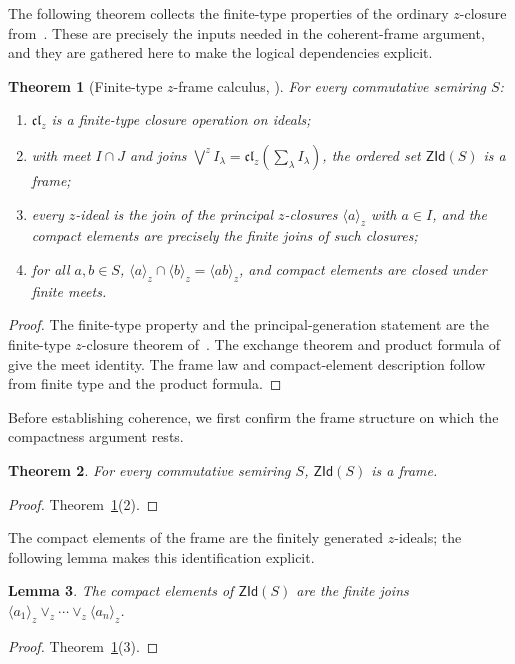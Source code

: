 \documentclass[11pt,leqno]{amsart}
\theoremstyle{plain}
\newtheorem{theorem}{Theorem}[section]
\newtheorem{lemma}[theorem]{Lemma}
\theoremstyle{definition}
\theoremstyle{remark}
\numberwithin{equation}{section}
\newcommand{\ZId}{\mathsf{ZId}}
\newcommand{\clz}{\mathfrak{cl}_{z}}
\newcommand{\ideal}[1]{\langle #1\rangle}
\begin{document}
The following theorem collects the finite-type properties of the
ordinary $z$-closure from~\cite{AG23,AG25}.
These are precisely the inputs needed in the coherent-frame argument,
and they are gathered here to make the logical dependencies explicit.

\begin{theorem}[Finite-type $z$-frame calculus,
\cite{AG23,AG25}]\label{lem:z-finite-type}
For every commutative semiring $S$:
\begin{enumerate}
\item $\clz$ is a finite-type closure operation on ideals;
\item with meet $I\cap J$ and joins
  $\bigvee^z I_\lambda=\clz(\sum_\lambda I_\lambda)$,
  the ordered set $\ZId(S)$ is a frame;
\item every $z$-ideal is the join of the principal $z$-closures
  $\ideal{a}_z$ with $a\in I$, and the compact elements are
  precisely the finite joins of such closures;
\item for all $a,b\in S$,
  $\ideal{a}_z\cap\ideal{b}_z=\ideal{ab}_z$,
  and compact elements are closed under finite meets.
\end{enumerate}
\end{theorem}
\begin{proof}
The finite-type property and the principal-generation statement
are the finite-type $z$-closure theorem of~\cite{AG23}.
The exchange theorem and product formula of~\cite{AG25}
give the meet identity.
The frame law and compact-element description follow from
finite type and the product formula.
\end{proof}

Before establishing coherence, we first confirm the frame structure
on which the compactness argument rests.

\begin{theorem}\label{loc22}
For every commutative semiring $S$, $\ZId(S)$ is a frame.
\end{theorem}
\begin{proof}
Theorem~\ref{lem:z-finite-type}(2).
\end{proof}

The compact elements of the frame are the finitely generated
$z$-ideals; the following lemma makes this identification explicit.

\begin{lemma}\label{loc25}
The compact elements of $\ZId(S)$ are the finite joins
$\ideal{a_1}_z\vee_z\cdots\vee_z\ideal{a_n}_z$.
\end{lemma}
\begin{proof}
Theorem~\ref{lem:z-finite-type}(3).
\end{proof}
\end{document}
